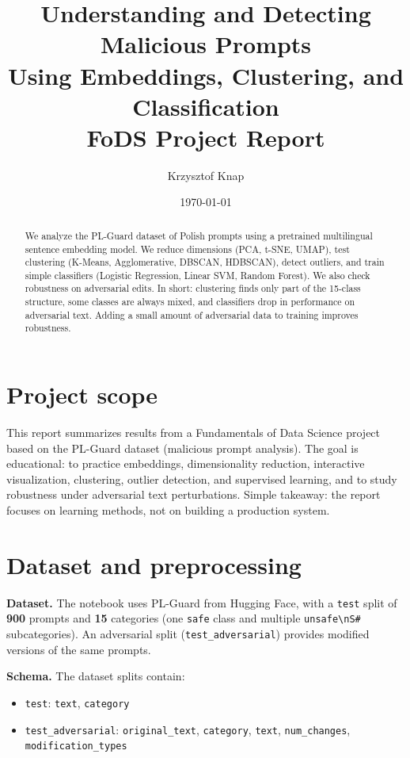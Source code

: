 \documentclass[11pt,a4paper]{article}
\title{Understanding and Detecting Malicious Prompts\\
Using Embeddings, Clustering, and Classification\\
\large{FoDS Project Report}}
\author{Krzysztof Knap}
\date{\today}
\begin{document}
\maketitle

\begin{abstract}
We analyze the PL-Guard dataset of Polish prompts using a pretrained multilingual sentence embedding model. We reduce dimensions (PCA, t-SNE, UMAP), test clustering (K-Means, Agglomerative, DBSCAN, HDBSCAN), detect outliers, and train simple classifiers (Logistic Regression, Linear SVM, Random Forest). We also check robustness on adversarial edits. In short: clustering finds only part of the 15-class structure, some classes are always mixed, and classifiers drop in performance on adversarial text. Adding a small amount of adversarial data to training improves robustness.
\end{abstract}

\section{Project scope}
This report summarizes results from a Fundamentals of Data Science project based on the PL-Guard dataset (malicious prompt analysis). The goal is educational: to practice embeddings, dimensionality reduction, interactive visualization, clustering, outlier detection, and supervised learning, and to study robustness under adversarial text perturbations.
\newline Simple takeaway: the report focuses on learning methods, not on building a production system.

\section{Dataset and preprocessing}
\textbf{Dataset.} The notebook uses PL-Guard from Hugging Face, with a \texttt{test} split of \textbf{900} prompts and \textbf{15} categories (one \texttt{safe} class and multiple \texttt{unsafe\textbackslash nS\#} subcategories). An adversarial split (\texttt{test\_adversarial}) provides modified versions of the same prompts.

\textbf{Schema.} The dataset splits contain:
\begin{itemize}[leftmargin=*]
\item \texttt{test}: \texttt{text}, \texttt{category}
\item \texttt{test\_adversarial}: \texttt{original\_text}, \texttt{category}, \texttt{text}, \texttt{num\_changes}, \texttt{modification\_types}
\end{itemize}
\end{document}
